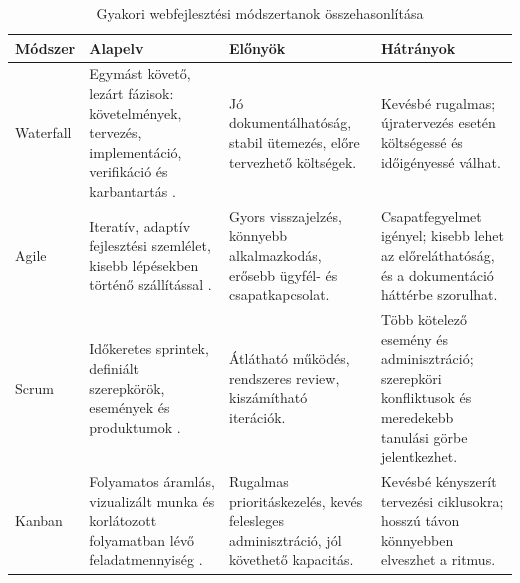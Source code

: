 \begin{table}[H]
\centering
\small
\setlength{\tabcolsep}{3pt}
\renewcommand{\arraystretch}{1.25}
\begin{tabular}{|p{}|p{}|p{}|p{}|}
\hline
\textbf{Módszer} & \textbf{Alapelv} & \textbf{Előnyök} & \textbf{Hátrányok} \\
\hline
Waterfall & Egymást követő, lezárt fázisok: követelmények, tervezés, implementáció, verifikáció és karbantartás \cite{ibmSdlc,ibmAgileVsWaterfall}. & Jó dokumentálhatóság, stabil ütemezés, előre tervezhető költségek. & Kevésbé rugalmas; újratervezés esetén költségessé és időigényessé válhat. \\
\hline
Agile & Iteratív, adaptív fejlesztési szemlélet, kisebb lépésekben történő szállítással \cite{agileManifesto2001,ibmAgileVsWaterfall}. & Gyors visszajelzés, könnyebb alkalmazkodás, erősebb ügyfél- és csapatkapcsolat. & Csapatfegyelmet igényel; kisebb lehet az előreláthatóság, és a dokumentáció háttérbe szorulhat. \\
\hline
Scrum & Időkeretes sprintek, definiált szerepkörök, események és produktumok \cite{schwaberSutherland2020scrumGuide}. & Átlátható működés, rendszeres review, kiszámítható iterációk. & Több kötelező esemény és adminisztráció; szerepköri konfliktusok és meredekebb tanulási görbe jelentkezhet. \\
\hline
Kanban & Folyamatos áramlás, vizualizált munka és korlátozott folyamatban lévő feladatmennyiség \cite{kanbanGuides2025}. & Rugalmas prioritáskezelés, kevés felesleges adminisztráció, jól követhető kapacitás. & Kevésbé kényszerít tervezési ciklusokra; hosszú távon könnyebben elveszhet a ritmus. \\
\hline
\end{tabular}
\caption{Gyakori webfejlesztési módszertanok összehasonlítása}
\label{tab:web-development-methodologies}
\end{table}
